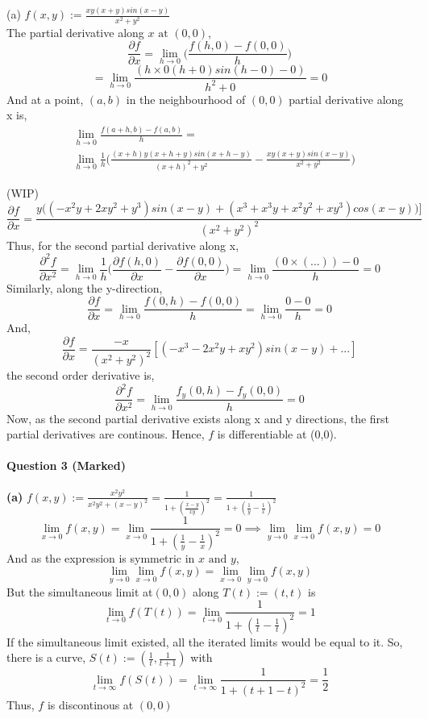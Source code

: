 \documentclass[20pt,a4paper]{extarticle} %
\theoremstyle{definition}
\theoremstyle{definition}
\begin{document}
(a) $f(x,y):=\frac{xy(x+y)sin(x-y)}{x^2+y^2}$\\
The partial derivative along $x \text{ at } (0,0) $,
\[ \frac{\partial f}{\partial x} =\lim_{h \to 0} \Big( \frac{f(h,0)-f(0,0)}{h} \Big) \]
\[=\lim_{h \to 0} \frac{(h\times 0(h+0)sin(h-0)-0)}{h^2+0}=0 \]
And at a point, $(a,b)$  in the neighbourhood of $(0,0)$ partial derivative along x is,
\begin{align*}
	& \lim_{h \to 0} \frac{f(a+h,b)-f(a,b)}{h} = \\ & \lim_{h \to 0} \frac{1}{h} \Big(
	\frac{(x+h)y(x+h+y)sin(x+h-y)}{(x+h)^2+y^2}- \frac{xy(x+y)sin(x-y)}{x^2+y^2} \Big)
\end{align*}

(WIP)
\[ \frac{\partial f}{\partial x} = \frac{y\big( (-x^2y+2xy^2+y^3)sin(x-y)+(x^3+x^3y+x^2y^2+xy^3)cos(x-y) \big)]}{(x^2+y^2)^2} \]
Thus, for the second partial derivative along x,
\[ \frac{\partial^2 f}{\partial x^2}=\lim_{h \to 0} \frac{1}{h} \Big( \frac{\partial f (h,0)}{\partial x}
-\frac{\partial f (0,0)}{\partial x} \Big)= \lim_{h \to 0} \frac{(0\times (...))-0}{h}=0 \]
Similarly, along the y-direction, \\
\[ \frac{\partial f}{\partial x} = \lim_{h \to 0} \frac{f(0,h)-f(0,0)}{h}= \lim_{h \to 0}
\frac{0-0}{h}=0\]
And,
\[  \frac{\partial f}{\partial x} = \frac{-x}{(x^2+y^2)^2}[(-x^3-2x^2y+xy^2)sin(x-y)+...]\]
the second order derivative is,
\[ \frac{\partial^2 f}{\partial x^2} = \lim_{h \to 0} \frac{f_y(0,h)-f_y(0,0)}{h}=0 \]
Now, as the second partial derivative exists along x and y directions, the first partial derivatives are continous. Hence, $f$ is differentiable at (0,0).
\newpage



\paragraph{Question 3 (Marked)}
\textbf{(a)} $f(x,y):=\frac{x^2y^2}{x^2y^2+(x-y)^2}=\frac{1}{1+(\frac{x-y}{xy})^2}=\frac{1}{1+(\frac{1}{y}-\frac{1}{x})^2}$\\
\[ \lim_{x \to 0} f(x,y)=\lim_{x \to 0} \frac{1}{1+(\frac{1}{y}-\frac{1}{x})^2}=0
\implies \lim_{y \to 0}\lim_{x \to 0}f(x,y)=0 \]
And as the expression is symmetric in $x \text{ and } y$,
\[ \lim_{y \to 0}\lim_{x \to 0}f(x,y)=\lim_{x \to 0}\lim_{y \to 0}f(x,y)\]
But the simultaneous limit at$(0,0)$  along $T(t):=(t,t) $ is
\[ \lim_{t \to 0} f(T(t))= \lim_{t \to 0} \frac{1}{1+(\frac{1}{t}-\frac{1}{t})^2}=1 \]
If the simultaneous limit existed, all the iterated limits would be equal to it. So, there is a curve,
$S(t):=(\frac{1}{t},\frac{1}{t+1})$ with
\[ \lim_{t \to \infty} f(S(t)) = \lim_{t \to \infty} \frac{1}{1+(t+1-t)^2}=\frac{1}{2} \]
Thus, $f$ is discontinous at $(0,0)$
\end{document}
